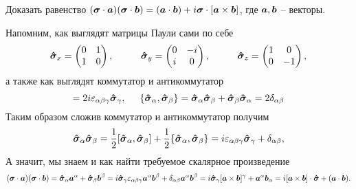 \begin{leftrules}
	Доказать равенство $(\mbox{\boldmath $\sigma$} \cdot \mbox{\boldmath $a$})(\mbox{\boldmath $\sigma$} \cdot \mbox{\boldmath $b$}) = (\mbox{\boldmath $a$} \cdot \mbox{\boldmath $b$}) + i \mbox{\boldmath $\sigma$}\cdot [\mbox{\boldmath $a$} \times \mbox{\boldmath $b$}]$, где $\mbox{\boldmath $a$}, \mbox{\boldmath $b$}$ -- векторы.
\end{leftrules}
Напомним, как выглядят матрицы Паули сами по себе
\begin{equation*}
	\mbox{\boldmath $\hat{\sigma}$}_x = \begin{pmatrix}
	    0 & 1 \\
	    1 & 0 \\
	\end{pmatrix},
	\hspace{1 cm}
	\mbox{\boldmath $\hat{\sigma}$}_y = \begin{pmatrix}
	    0 & -i \\
	    i & 0 \\
	\end{pmatrix},
	\hspace{1 cm}
	\mbox{\boldmath $\hat{\sigma}$}_z = \begin{pmatrix}
	    1 & 0 \\
	    0 & -1 \\
	\end{pmatrix},
\end{equation*}
а также как выглядят коммутатор и антикоммутатор
\begin{equation*}
	[\vc{\hat{\sigma}}_\alpha, \vc{\hat{\sigma}}_\beta] 
	= 2 i \varepsilon_{\alpha \beta \gamma} \vc{\hat{\sigma}}_\gamma,
	\hspace{0.5 cm}
	\{\vc{\hat{\sigma}}_\alpha, \vc{\hat{\sigma}}_\beta\}
	= \vc{\hat{\sigma}}_\alpha \vc{\hat{\sigma}}_\beta + \vc{\hat{\sigma}}_\beta \vc{\hat{\sigma}}_\alpha
	= 2 \delta_{\alpha \beta}
\end{equation*}
Таким образом сложив коммутатор и антикоммутатор получим
\begin{equation*}
	\mbox{\boldmath $\hat{\sigma}$}_\alpha \mbox{\boldmath $\hat{\sigma}$}_\beta  = \frac{1}{2} [\mbox{\boldmath $\hat{\sigma}$}_\alpha, \mbox{\boldmath $\hat{\sigma}$}_\beta] + \frac{1}{2} \{\mbox{\boldmath $\hat{\sigma}$}_\alpha, \mbox{\boldmath $\hat{\sigma}$}_\beta\}
	=
	i \varepsilon_{\alpha \beta \gamma} \mbox{\boldmath $\hat{\sigma}$}_\gamma + \delta_{\alpha\beta},
\end{equation*}
А значит, мы знаем и как найти требуемое скалярное произведение
\begin{equation*}
	(\mbox{\boldmath $\sigma$} \cdot \mbox{\boldmath $a$})(\mbox{\boldmath $\sigma$} \cdot \mbox{\boldmath $b$}) = 
	\mbox{\boldmath $\hat{\sigma}$}_\alpha \mbox{\boldmath $a$}^\alpha + \mbox{\boldmath $\hat{\sigma}$}_\beta \mbox{\boldmath $b$}^\beta
	=
	i \mbox{\boldmath $\hat{\sigma}$}_\gamma \varepsilon_{\alpha \beta \gamma} \mbox{\boldmath $a$}^\alpha \mbox{\boldmath $b$}^\beta  + \delta_{\alpha\beta} \mbox{\boldmath $a$}^\alpha \mbox{\boldmath $b$}^\beta
	=
	i \mbox{\boldmath $\hat{\sigma}$}_\gamma [\mbox{\boldmath $a$} \times \mbox{\boldmath $b$}]^\gamma + \mbox{\boldmath $a$}^\alpha \mbox{\boldmath $b$}_\alpha
	=
	i [\mbox{\boldmath $a$} \times \mbox{\boldmath $b$}]\cdot \mbox{\boldmath $\hat{\sigma}$} + (\mbox{\boldmath $a$} \cdot \mbox{\boldmath $b$}).
\end{equation*}
